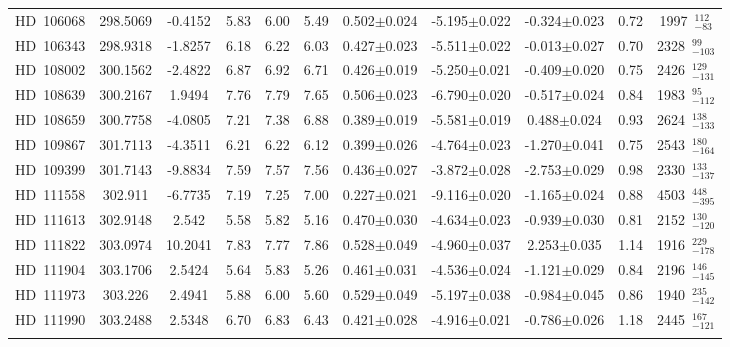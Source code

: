{\begin{longtable}{lcccccccccc}
HD~106068 & 298.5069 & -0.4152 & 5.83 & 6.00 & 5.49 & 0.502$\pm$0.024 & -5.195$\pm$0.022 & -0.324$\pm$0.023 & 0.72 & 1997~$_{-83}^{112}$ \\
\noalign{\smallskip}
HD~106343 & 298.9318 & -1.8257 & 6.18 & 6.22 & 6.03 & 0.427$\pm$0.023 & -5.511$\pm$0.022 & -0.013$\pm$0.027 & 0.70 & 2328~$_{-103}^{99}$ \\
\noalign{\smallskip}
HD~108002 & 300.1562 & -2.4822 & 6.87 & 6.92 & 6.71 & 0.426$\pm$0.019 & -5.250$\pm$0.021 & -0.409$\pm$0.020 & 0.75 & 2426~$_{-131}^{129}$ \\
\noalign{\smallskip}
HD~108639 & 300.2167 & 1.9494 & 7.76 & 7.79 & 7.65 & 0.506$\pm$0.023 & -6.790$\pm$0.020 & -0.517$\pm$0.024 & 0.84 & 1983~$_{-112}^{95}$ \\
\noalign{\smallskip}
HD~108659 & 300.7758 & -4.0805 & 7.21 & 7.38 & 6.88 & 0.389$\pm$0.019 & -5.581$\pm$0.019 & 0.488$\pm$0.024 & 0.93 & 2624~$_{-133}^{138}$ \\
\noalign{\smallskip}
HD~109867 & 301.7113 & -4.3511 & 6.21 & 6.22 & 6.12 & 0.399$\pm$0.026 & -4.764$\pm$0.023 & -1.270$\pm$0.041 & 0.75 & 2543~$_{-164}^{180}$ \\
\noalign{\smallskip}
HD~109399 & 301.7143 & -9.8834 & 7.59 & 7.57 & 7.56 & 0.436$\pm$0.027 & -3.872$\pm$0.028 & -2.753$\pm$0.029 & 0.98 & 2330~$_{-137}^{133}$ \\
\noalign{\smallskip}
HD~111558 & 302.911 & -6.7735 & 7.19 & 7.25 & 7.00 & 0.227$\pm$0.021 & -9.116$\pm$0.020 & -1.165$\pm$0.024 & 0.88 & 4503~$_{-395}^{448}$ \\
\noalign{\smallskip}
HD~111613 & 302.9148 & 2.542 & 5.58 & 5.82 & 5.16 & 0.470$\pm$0.030 & -4.634$\pm$0.023 & -0.939$\pm$0.030 & 0.81 & 2152~$_{-120}^{130}$ \\
\noalign{\smallskip}
HD~111822 & 303.0974 & 10.2041 & 7.83 & 7.77 & 7.86 & 0.528$\pm$0.049 & -4.960$\pm$0.037 & 2.253$\pm$0.035 & 1.14 & 1916~$_{-178}^{229}$ \\
\noalign{\smallskip}
HD~111904 & 303.1706 & 2.5424 & 5.64 & 5.83 & 5.26 & 0.461$\pm$0.031 & -4.536$\pm$0.024 & -1.121$\pm$0.029 & 0.84 & 2196~$_{-145}^{146}$ \\
\noalign{\smallskip}
HD~111973 & 303.226 & 2.4941 & 5.88 & 6.00 & 5.60 & 0.529$\pm$0.049 & -5.197$\pm$0.038 & -0.984$\pm$0.045 & 0.86 & 1940~$_{-142}^{235}$ \\
\noalign{\smallskip}
HD~111990 & 303.2488 & 2.5348 & 6.70 & 6.83 & 6.43 & 0.421$\pm$0.028 & -4.916$\pm$0.021 & -0.786$\pm$0.026 & 1.18 & 2445~$_{-121}^{167}$ \\
\noalign{\smallskip}

\end{longtable}}
